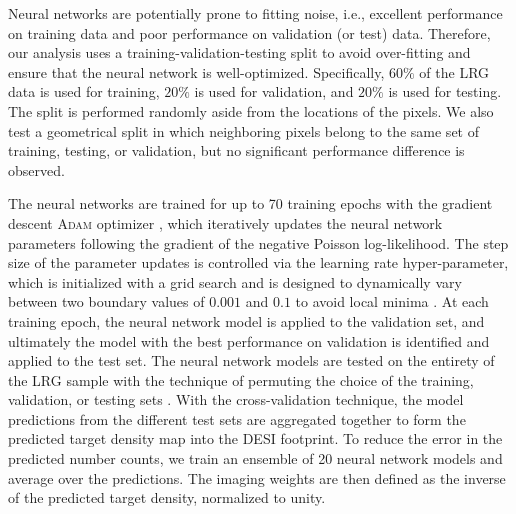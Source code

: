 Neural networks are potentially prone to fitting noise, i.e., excellent performance on training data and poor performance on validation (or test) data. Therefore, our analysis uses a training-validation-testing split to avoid over-fitting and ensure that the neural network is well-optimized. Specifically, $60\%$ of the LRG data is used for training, $20\%$ is used for validation, and $20\%$ is used for testing. The split is performed randomly aside from the locations of the pixels. We also test a geometrical split in which neighboring pixels belong to the same set of training, testing, or validation, but no significant performance difference is observed.

The neural networks are trained for up to 70 training epochs with the gradient descent \textsc{Adam} optimizer \citep{2017arXiv171105101L}, which iteratively updates the neural network parameters following the gradient of the negative Poisson log-likelihood. The step size of the parameter updates is controlled via the learning rate hyper-parameter, which is initialized with a grid search and is designed to dynamically vary between two boundary values of $0.001$ and $0.1$ to avoid local minima \citep[see, also,][]{2016arXiv160803983L}. At each training epoch, the neural network model is applied to the validation set, and ultimately the model with the best performance on validation is identified and applied to the test set. The neural network models are tested on the entirety of the LRG sample with the technique of permuting the choice of the training, validation, or testing sets \citep{arlot2010survey}. With the cross-validation technique, the model predictions from the different test sets are aggregated together to form the predicted target density map into the DESI footprint. To reduce the error in the predicted number counts, we train an ensemble of 20 neural network models and average over the predictions. The imaging weights are then defined as the inverse of the predicted target density, normalized to unity.

